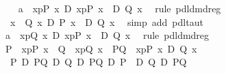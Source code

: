 \begin{isabellebody}
\ \ \isamarkupfalse%
\ a{}{\isacharcolon}\ {\isachardoublequote}{\isasymturnstile}\ {\isasymlangle}x{\isasymleftarrow}p{\isasymrangle}{\isacharparenleft}P\ x{\isacharparenright}\ {\isasymlongrightarrow}\isactrlsub D\ {\isasymlangle}x{\isasymleftarrow}p{\isasymrangle}{\isacharparenleft}P\ x\ \ {\isasymor}\isactrlsub D\ Q\ x{\isacharparenright}{\isachardoublequote}\ \isamarkupfalse%
\ {\isacharparenleft}rule\ pdl{\isacharunderscore}dmd{\isacharunderscore}reg{\isacharparenright}\isanewline
\ \ \isamarkupfalse%
\ {\isachardoublequote}\ {\isasymforall}x{\isachardot}\ {\isasymturnstile}\ Q\ x\ {\isasymlongrightarrow}\isactrlsub D\ P\ x\ \ {\isasymor}\isactrlsub D\ Q\ x{\isachardoublequote}\ \isamarkupfalse%
\ {\isacharparenleft}simp\ add{\isacharcolon}\ pdl{\isacharunderscore}taut{\isacharparenright}\isanewline
\ \ \isamarkupfalse%
\ a{}{\isacharcolon}\ {\isachardoublequote}{\isasymturnstile}\ {\isasymlangle}x{\isasymleftarrow}p{\isasymrangle}{\isacharparenleft}Q\ x{\isacharparenright}\ {\isasymlongrightarrow}\isactrlsub D\ {\isasymlangle}x{\isasymleftarrow}p{\isasymrangle}{\isacharparenleft}P\ x\ \ {\isasymor}\isactrlsub D\ Q\ x{\isacharparenright}{\isachardoublequote}\ \isamarkupfalse%
\ {\isacharparenleft}rule\ pdl{\isacharunderscore}dmd{\isacharunderscore}reg{\isacharparenright}\isanewline
\ \ \isamarkupfalse%
\ {\isacharquery}P\ {\isacharequal}\ {\isachardoublequote}{\isasymlangle}x{\isasymleftarrow}p{\isasymrangle}{\isacharparenleft}P\ x{\isacharparenright}{\isachardoublequote}\ \ {\isacharquery}Q\ {\isacharequal}\ {\isachardoublequote}{\isasymlangle}x{\isasymleftarrow}p{\isasymrangle}{\isacharparenleft}Q\ x{\isacharparenright}{\isachardoublequote}\ \ {\isacharquery}PQ\ {\isacharequal}\ {\isachardoublequote}{\isasymlangle}x{\isasymleftarrow}p{\isasymrangle}{\isacharparenleft}P\ x\ {\isasymor}\isactrlsub D\ Q\ x{\isacharparenright}{\isachardoublequote}\isanewline
\ \ \isamarkupfalse%
\ {\isachardoublequote}{\isasymturnstile}\ {\isacharparenleft}{\isacharquery}P\ {\isasymlongrightarrow}\isactrlsub D\ {\isacharquery}PQ{\isacharparenright}\ {\isasymlongrightarrow}\isactrlsub D\ {\isacharparenleft}{\isacharquery}Q\ {\isasymlongrightarrow}\isactrlsub D\ {\isacharquery}PQ{\isacharparenright}\ {\isasymlongrightarrow}\isactrlsub D\ {\isacharparenleft}{\isacharquery}P\ \ {\isasymor}\isactrlsub D\ {\isacharquery}Q\ {\isasymlongrightarrow}\isactrlsub D\ {\isacharquery}PQ{\isacharparenright}{\isachardoublequote}\isanewline

\end{isabellebody}
